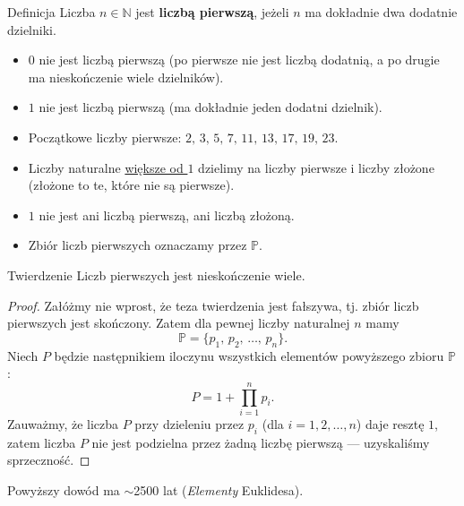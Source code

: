 \documentclass[a4paper,10pt]{beamer}
\begin{document}
\begin{frame}
	
	\begin{block}{Definicja}
		Liczba $n\in\mathbb{N}$ jest {\bf liczbą pierwszą}, jeżeli $n$ ma dokładnie dwa dodatnie dzielniki. 
	\end{block}


		\begin{itemize}
		\item $0$ nie jest liczbą pierwszą (po pierwsze nie jest liczbą dodatnią, a po drugie ma nieskończenie wiele dzielników).
		
		\item $1$ nie jest liczbą pierwszą (ma dokładnie jeden dodatni dzielnik).
		
		\item Początkowe liczby pierwsze: $2,\,3,\,5,\,7,\,11,\,13,\,17,\,19,\,23$.
		
		\item Liczby naturalne \underline{większe od $1$} dzielimy na liczby pierwsze i liczby złożone (złożone to te, które nie są pierwsze). 
		
		\item $1$ nie jest ani liczbą pierwszą, ani liczbą złożoną.
		
		\item Zbiór liczb pierwszych oznaczamy przez $\mathbb{P}$.
		\end{itemize}
	

\end{frame}

\begin{frame}
	
	\begin{block}{Twierdzenie}
		Liczb pierwszych jest nieskończenie wiele.
	\end{block}
	
	\begin{proof}
		Załóżmy nie wprost, że teza twierdzenia jest fałszywa, tj. zbiór liczb pierwszych jest skończony. Zatem dla pewnej liczby naturalnej $n$ mamy $$\mathbb{P}=\{p_1,\,p_2,\,\ldots,\,p_n\}.$$ Niech $P$ będzie następnikiem iloczynu wszystkich elementów powyższego zbioru $\mathbb{P}$:
		$$P=1+\prod\limits_{i=1}^n{p_i}.$$
		Zauważmy, że liczba $P$ przy dzieleniu przez $p_i$ (dla $i=1,2,\ldots,n$) daje resztę $1$, zatem liczba $P$ nie jest podzielna przez żadną liczbę pierwszą --- uzyskaliśmy sprzeczność.
	\end{proof}
	Powyższy dowód ma $\sim$2500 lat ({\it Elementy} Euklidesa).
	
\end{frame}
\end{document}
